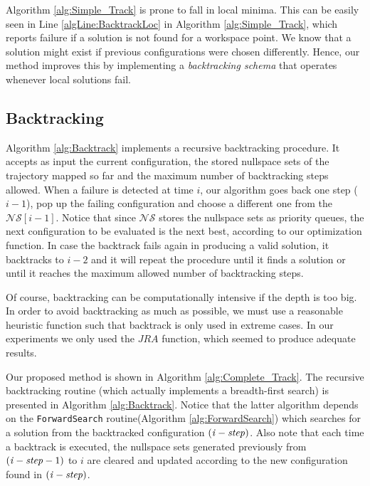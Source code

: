 \documentclass[conference]{IEEEtran}
\newcommand{\nsS}{\ensuremath{\mathcal{NS}}}  %
\begin{document}
Algorithm \ref{alg:Simple_Track} is prone to fall in local minima. This
can be easily seen in Line \ref{algLine:BacktrackLoc} in Algorithm \ref{alg:Simple_Track}, which 
reports failure if a solution is not found for a workspace point. We know that a solution might exist 
if previous configurations were chosen differently. Hence, our method improves this by implementing a
\textit{backtracking schema} that operates whenever local solutions fail. 

\subsection{Backtracking}
Algorithm \ref{alg:Backtrack} implements a recursive backtracking procedure. It accepts as
input the current configuration, the stored nullspace sets of the trajectory mapped so far
and the maximum number of backtracking steps allowed. When a failure is detected at time $i$, our
algorithm goes back one step ($i-1$), pop up the failing configuration and choose a different one 
from the $\nsS[i-1]$. Notice that since $\nsS$ stores the nullspace sets as priority queues, the next
configuration to be evaluated is the next best, according to our optimization function. In case the 
backtrack fails again in producing a valid solution, it backtracks to $i-2$ and it will repeat
the procedure until it finds a solution or until it reaches the maximum allowed number of backtracking steps.

Of course, backtracking can be computationally intensive if the depth is too big. In order to avoid
backtracking as much as possible, we must use a reasonable heuristic function such that backtrack is only
used in extreme cases. In our experiments we only used the $JRA$ function, which seemed to produce adequate results.  

Our proposed method is shown in Algorithm \ref{alg:Complete_Track}. The recursive backtracking routine (which actually
implements a breadth-first search) is presented in Algorithm \ref{alg:Backtrack}. Notice that the latter algorithm
depends on the \texttt{ForwardSearch} routine(Algorithm \ref{alg:ForwardSearch}) which searches for a solution from
the backtracked configuration $(\ArgSty{i}-\ArgSty{step})$. Also note that each time a backtrack is executed, the nullspace sets generated previously
from $(\ArgSty{i}-\ArgSty{step}-1)$ to $i$ are cleared and updated according to the new configuration found in  $(\ArgSty{i}- \ArgSty{step})$.
\end{document}
